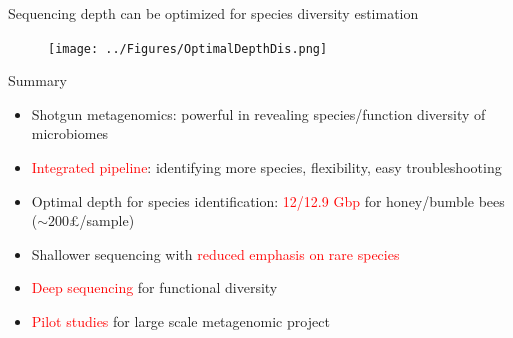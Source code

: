 \documentclass{beamer}
\begin{document}
\begin{frame}{Sequencing depth can be optimized for species diversity estimation}
    \begin{figure}
        \texttt{[image: ../Figures/OptimalDepthDis.png]}
    \end{figure}
\end{frame}

\begin{frame}{Summary}
    \begin{itemize}
        \item Shotgun metagenomics: powerful in revealing species/function diversity of microbiomes
        \item \textcolor{red}{Integrated pipeline}: identifying more species, flexibility, easy troubleshooting
        \item Optimal depth for species identification: \textcolor{red}{12/12.9 Gbp} for honey/bumble bees ($\sim 200$\pounds/sample)
        \item Shallower sequencing with \textcolor{red}{reduced emphasis on rare species}
        \item \textcolor{red}{Deep sequencing} for functional diversity
        \item \textcolor{red}{Pilot studies} for large scale metagenomic project
    \end{itemize}
\end{frame}
\end{document}
